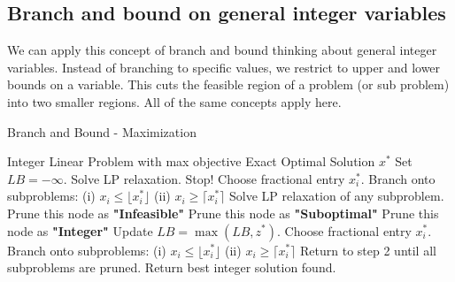 \subsection{Branch and bound on general integer variables}

We can apply this concept of branch and bound thinking about general integer variables.  Instead of branching to specific values, we restrict to upper and lower bounds on a variable.  This cuts the feasible region of a problem (or sub problem) into two smaller regions.  All of the same concepts apply here.

\begin{algorithm}[H]
\caption{Branch and Bound - Maximization}\label{alg:branch-and-bound-max}
\begin{algorithmic}[1]
    \Require Integer Linear Problem with max objective
    \Ensure Exact Optimal Solution $x^*$
    \State Set $LB = - \infty$.
    \State Solve LP relaxation. 
        \State Stop!
    \Else
        \State Choose fractional entry $x_i^*$.
        \State Branch onto subproblems:
        \Statex \hspace{2em} (i) $x_i \leq \lfloor x^*_i \rfloor$
        \Statex \hspace{2em} (ii) $x_i \geq \lceil x^*_i \rceil$
    \EndIf
    \State Solve LP relaxation of any subproblem.
        \State Prune this node as \textbf{"Infeasible"}
        \State Prune this node as \textbf{"Suboptimal"}
        \State Prune this node as \textbf{"Integer"}
        \State Update $LB = \max(LB, z^*)$.
    \Else
        \State Choose fractional entry $x_i^*$.
        \State Branch onto subproblems:
        \Statex \hspace{2em} (i) $x_i \leq \lfloor x^*_i \rfloor$
        \Statex \hspace{2em} (ii) $x_i \geq \lceil x^*_i \rceil$
        \State Return to step 2 until all subproblems are pruned.
    \EndIf
    \State Return best integer solution found.
\end{algorithmic}
\end{algorithm}

